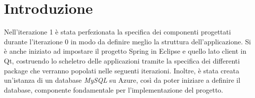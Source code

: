 \section{Introduzione}
Nell'iterazione 1 è stata perfezionata la specifica dei componenti progettati durante l'iterazione 0 in modo da definire meglio la struttura dell'applicazione. Si è anche iniziato ad impostare il progetto Spring in Eclipse e quello lato client in Qt, costruendo lo scheletro delle applicazioni tramite la specifica dei differenti package che verranno popolati nelle seguenti iterazioni. Inoltre, è stata creata un'istanza di un database \textit{MySQL} su Azure, così da poter iniziare a definire il database, componente fondamentale per l'implementazione del progetto.

\clearpage
